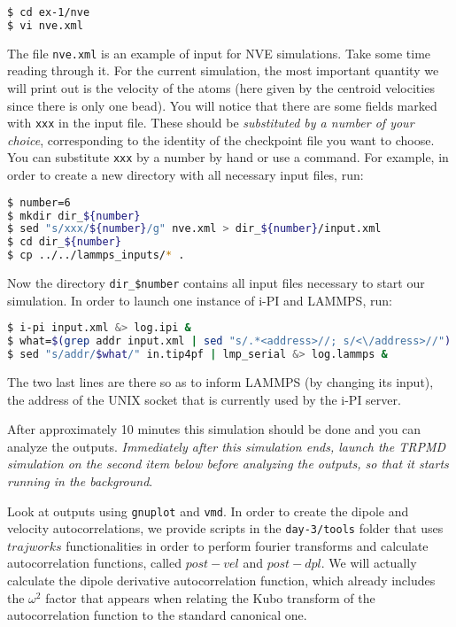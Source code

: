 \documentclass{article}
\begin{document}
\begin{Exercise}[label={realtime},title={Velocity and dipole real time correlation functions}]
\begin{itemize}
\begin{lstlisting}[language=Bash,emph={\$}]
$ cd ex-1/nve
$ vi nve.xml
\end{lstlisting}

   The file \texttt{nve.xml} is an example of input for NVE simulations. Take some time reading through it. For the current simulation, the most important quantity we will print out is the velocity of the atoms (here given by the centroid velocities since there is only one bead). You will notice that there are some fields marked with \texttt{xxx} in the input file. These should be {\it substituted by a number of your choice}, corresponding to the identity of the checkpoint file you want to choose. You can substitute \texttt{xxx} by a number  by hand or use a command. For example, in order to create a new directory with all necessary input files, run:

\begin{lstlisting}[language=Bash,emph={\$}]
$ number=6
$ mkdir dir_${number} 
$ sed "s/xxx/${number}/g" nve.xml > dir_${number}/input.xml
$ cd dir_${number}
$ cp ../../lammps_inputs/* .

\end{lstlisting}

Now the directory \texttt{dir\_\$number} contains all input files necessary to start our simulation. In order to launch one instance of i-PI and LAMMPS, run:

\begin{lstlisting}[language=Bash,emph={\$}]
$ i-pi input.xml &> log.ipi &
$ what=$(grep addr input.xml | sed "s/.*<address>//; s/<\/address>//")
$ sed "s/addr/$what/" in.tip4pf | lmp_serial &> log.lammps &

\end{lstlisting}

The two last lines are there so as to inform LAMMPS (by changing its input), the address of the UNIX socket that is currently used by the i-PI server.

After approximately 10 minutes this simulation should be done and you can analyze the outputs. {\it Immediately after this simulation ends, launch the TRPMD simulation on the second item below before analyzing the outputs, so that it starts running in the background}.

Look at outputs using \texttt{gnuplot} and \texttt{vmd}. In order to create the dipole and velocity autocorrelations, we provide scripts in the \texttt{day-3/tools} folder that uses \lstinbash$trajworks$ functionalities in order to perform fourier transforms and calculate autocorrelation functions, called \lstinbash$post-vel$ and \lstinbash$post-dpl$. We will actually calculate the dipole derivative autocorrelation function, which already includes the $\omega^2$ factor that appears when relating the Kubo transform of the autocorrelation function to the standard canonical one.


\end{itemize}
\end{Exercise}
\end{document}
